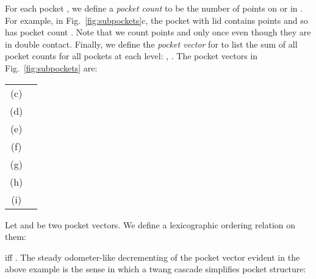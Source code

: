 \pdfoutput=1  \documentclass{article}
\newcommand{\figref}[1]{\ref{fig:#1}}
\begin{document}
For each pocket 
,
we define a \emph{pocket count} 
to be the number of points on or in
.
For example, in 
Fig.~\figref{subpockets}c,
the pocket with lid  contains points
 and so has pocket count .
Note that we count points  and  only once even though
they are in double contact.
Finally, we define the \emph{pocket vector}  for
 to list the sum of all pocket counts for
all pockets at each level:
,
.
The pocket vectors in Fig.~\figref{subpockets} are:

\begin{center}
\begin{tabular}{|c|l|}
\hline
(c)  &    \\
(d)  &    \\
(e)  &    \\
(f)  &    \\
(g)  &    \\
(h)  &    \\
(i)  &    \\
\hline
\end{tabular}
\end{center}

Let  and  be two pocket vectors.
We define a lexicographic ordering relation on them:

iff
.
The steady odometer-like decrementing of the pocket vector
evident in the above example
is the sense in which a twang cascade simplifies pocket structure:
\end{document}
